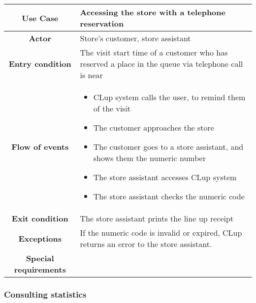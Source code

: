 \documentclass[../../main.tex]{subfiles}
\begin{document}
      \begin{table}[H]
        \centering
          \begin{tabular}{c m{}}
          \hline
          \textbf{Use Case} & Accessing the store with a telephone reservation\\ \hline
          \textbf{Actor} & Store's customer, store assistant\\ \hline
          \textbf{Entry condition} & The visit start time of a customer who has reserved a place in the queue via telephone call is near\\  \hline
          \textbf{Flow of events} & \begin{itemize}
                                      \item CLup system calls the user, to remind them of the visit
                                      \item The customer approaches the store
                                      \item The customer goes to a store assistant, and shows them the numeric number
                                      \item The store assistant accesses CLup system
                                      \item The store assistant checks the numeric code
                                    \end{itemize}\\ \hline
          \textbf{Exit condition} & The store assistant prints the line up receipt \\ \hline
          \textbf{Exceptions} & If the numeric code is invalid or expired, CLup returns an error to the store assistant.\\ \hline
          \textbf{Special requirements} &\\ \hline
          \end{tabular}
      \end{table}


      \subsubsection{Consulting statistics} %
\end{document}
